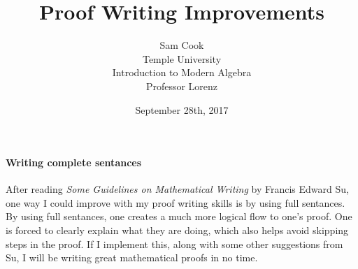 \documentclass{article}
\title{Proof Writing Improvements}
\author{Sam Cook\\
Temple University\\
Introduction to Modern Algebra
\\Professor Lorenz}
\date{September 28th, 2017}
\begin{document}
\maketitle

\paragraph{Writing complete sentances}
After reading \textit{Some Guidelines on Mathematical Writing} by Francis Edward Su, one way I could improve with my proof writing skills is by using full sentances. By using full sentances, one creates a much more logical flow to one's proof. One is forced to clearly explain what they are doing, which also helps avoid skipping steps in the proof. If I implement this, along with some other suggestions from Su, I will be writing great mathematical proofs in no time.
\end{document}
